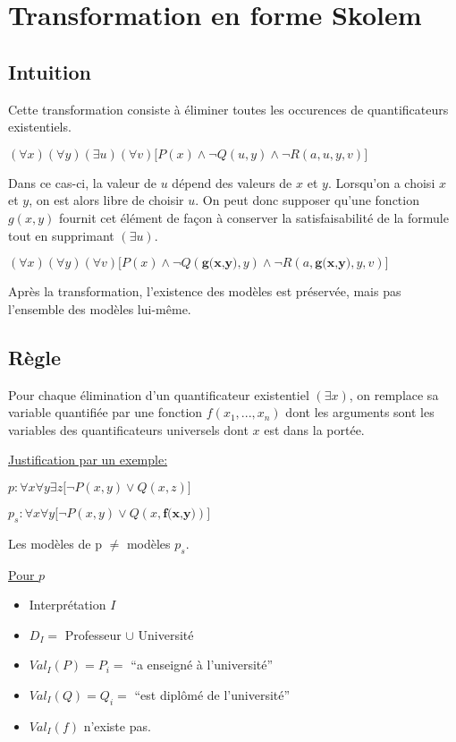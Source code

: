 \section{Transformation en forme Skolem}
\subsection{Intuition}

Cette transformation consiste à éliminer toutes les occurences de quantificateurs existentiels.
\smallskip

$(\forall x)(\forall y)(\exists u)(\forall v) \big[ P(x) \wedge \neg Q(u,y) \wedge \neg R(a,u,y,v) \big]$
\smallskip 


Dans ce cas-ci, la valeur de $u$ dépend des valeurs de $x$ et $y$. Lorsqu'on a choisi $x$ et $y$, on est alors libre de choisir $u$.
On peut donc supposer qu'une fonction $g(x,y)$ fournit cet élément de façon à conserver la satisfaisabilité de la formule tout en supprimant $(\exists u)$.
\smallskip

$(\forall x)(\forall y)(\forall v) \big[ P(x) \wedge \neg Q(\textbf{g(x,y)},y) \wedge \neg R(a,\textbf{g(x,y)},y,v) \big]$
\smallskip

Après la transformation, l'existence des modèles est préservée, mais pas l'ensemble des modèles lui-même.

\subsection{Règle}

Pour chaque élimination d'un quantificateur existentiel $(\exists x)$, on remplace sa variable quantifiée par une fonction $f(x_1,...,x_n)$ dont les arguments sont les variables des quantificateurs universels dont $x$ est dans la portée.
\smallskip

\underline{Justification par un exemple:}

$p: \forall x \forall y \exists z \big[ \neg P(x,y) \vee Q(x,z) \big]$
\smallskip

$p_s: \forall x \forall y \big[ \neg P(x,y) \vee Q(x,\textbf{f(x,y)}) \big]$
\smallskip

Les modèles de p $\neq$ modèles $p_s$.

\underline{Pour $p$}
\begin{itemize}
  \item Interprétation $I$
  \item $D_I =$ Professeur $\cup$ Université
  \item $Val_I(P) = P_i = $ ``a enseigné à l'université''
  \item $Val_I(Q) = Q_i = $ ``est diplômé de l'université''
  \item $Val_I(f)$ n'existe pas.
\end{itemize}

